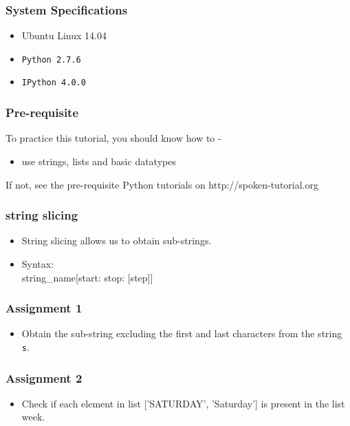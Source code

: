 \documentclass[17pt]{beamer}
\begin{document}
\begin{frame}
\frametitle{System Specifications}\pause
\begin{itemize}
\item Ubuntu Linux 14.04\pause
\item \texttt{Python 2.7.6} \pause
\item \texttt{IPython 4.0.0}
\end{itemize}
\end{frame}
\begin{frame}
\frametitle{Pre-requisite}
\label{sec-3}

  To practice this tutorial, you should know how to -\pause

\begin{itemize}
\item use strings, lists and basic datatypes\pause
\end{itemize}
If not, see the pre-requisite Python tutorials on {\color{blue}http://spoken-tutorial.org}
\end{frame}
\begin{frame}
\frametitle{string slicing}

\begin{itemize}
\item String slicing allows us to obtain sub-strings.\pause

\item Syntax:\\
string\_name[start: stop: [step]]
\end{itemize}
\end{frame}
\begin{frame}
\frametitle{Assignment 1}

\begin{itemize}
\item Obtain the sub-string excluding the first and last characters from
  the string \texttt{s}.
\end{itemize}
\end{frame}
\begin{frame}
\frametitle{Assignment 2}
\label{sec-6}

\begin{itemize}
\item Check if each element in list ['SATURDAY', 'Saturday'] is present in the list week. 
\end{itemize}  
\end{frame}
\end{document}
